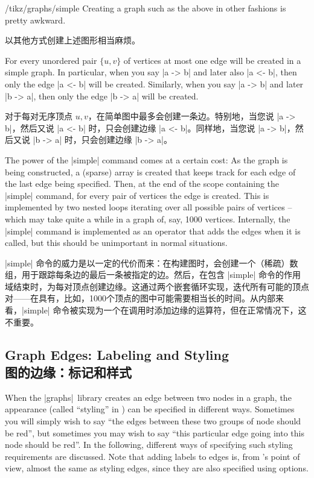 \begin{key}{/tikz/graphs/simple}
    Creating a graph such as the above in other fashions is pretty awkward.

    以其他方式创建上述图形相当麻烦。

    For every unordered pair $\{u,v\}$ of vertices at most one edge will be
    created in a simple graph. In particular, when you say |a -> b| and later
    also |a <- b|, then only the edge |a <- b| will be created. Similarly, when
    you say |a -> b| and later |b -> a|, then only the edge |b -> a| will be
    created.

    对于每对无序顶点 ${u,v}$，在简单图中最多会创建一条边。特别地，当您说 |a -> b|，然后又说 |a <- b| 时，只会创建边缘 |a <- b|。同样地，当您说 |a -> b|，然后又说 |b -> a| 时，只会创建边缘 |b -> a|。

    The power of the |simple| command comes at a certain cost: As the graph is
    being constructed, a (sparse) array is created that keeps track for each
    edge of the last edge being specified. Then, at the end of the scope
    containing the |simple| command, for every pair of vertices the edge is
    created. This is implemented by two nested loops iterating over all
    possible pairs of vertices -- which may take quite a while in a graph of,
    say, 1000 vertices. Internally, the |simple| command is implemented as an
    operator that adds the edges when it is called, but this should be
    unimportant in normal situations.

    |simple| 命令的威力是以一定的代价而来：在构建图时，会创建一个（稀疏）数组，用于跟踪每条边的最后一条被指定的边。然后，在包含 |simple| 命令的作用域结束时，为每对顶点创建边缘。这通过两个嵌套循环实现，迭代所有可能的顶点对——在具有，比如，1000个顶点的图中可能需要相当长的时间。从内部来看，|simple| 命令被实现为一个在调用时添加边缘的运算符，但在正常情况下，这不重要。
\end{key}


\subsection{Graph Edges: Labeling and Styling\\图的边缘：标记和样式}

When the |graphs| library creates an edge between two nodes in a graph, the
appearance (called ``styling'' in \tikzname) can be specified in different
ways. Sometimes you will simply wish to say ``the edges between these two
groups of node should be red'', but sometimes you may wish to say ``this
particular edge going into this node should be red''. In the following,
different ways of specifying such styling requirements are discussed. Note that
adding labels to edges is, from \tikzname's point of view, almost the same as
styling edges, since they are also specified using options.

